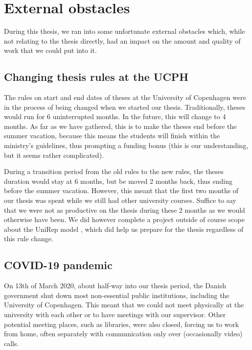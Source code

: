 
\section{External obstacles}
During this thesis, we ran into some unfortunate external obstacles which, while not relating to the thesis directly, had an impact on the amount and quality of work that we could put into it.

\subsection{Changing thesis rules at the UCPH}
The rules on start and end dates of theses at the University of Copenhagen were in the process of being changed when we started our thesis. Traditionally, theses would run for 6 uninterrupted months. In the future, this will change to 4 months. As far as we have gathered, this is to make the theses end before the summer vacation, because this means the students will finish within the ministry's guidelines, thus prompting a funding bonus (this is our understanding, but it seems rather complicated).

During a transition period from the old rules to the new rules, the theses duration would stay at 6 months, but be moved 2 months back, thus ending before the summer vacation. However, this meant that the first two months of our thesis was spent while we still had other university courses. Suffice to say that we were not as productive on the thesis during these 2 months as we would otherwise have been. We did however complete a project outside of course scope about the UniRep model \cite{unirepproject}, which did help us prepare for the thesis regardless of this rule change.

\subsection{COVID-19 pandemic}
On 13th of March 2020, about half-way into our thesis period, the Danish government shut down most non-essential public institutions, including the University of Copenhagen. This meant that we could not meet physically at the university with each other or to have meetings with our supervisor. Other potential meeting places, such as libraries, were also closed, forcing us to work from home, often separately with communication only over (occasionally video) calls.

